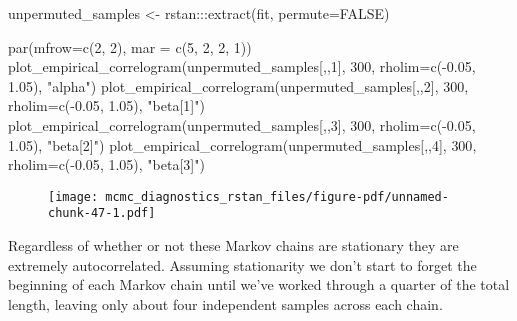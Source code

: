 \documentclass[
  letterpaper,
  DIV=11,
  numbers=noendperiod]{scrartcl}
\newenvironment{Shaded}{\begin{snugshade}}{\end{snugshade}}
\newcommand{\AttributeTok}[1]{\textcolor[rgb]{0.40,0.45,0.13}{#1}}
\newcommand{\ConstantTok}[1]{\textcolor[rgb]{0.56,0.35,0.01}{#1}}
\newcommand{\DecValTok}[1]{\textcolor[rgb]{0.68,0.00,0.00}{#1}}
\newcommand{\FloatTok}[1]{\textcolor[rgb]{0.68,0.00,0.00}{#1}}
\newcommand{\FunctionTok}[1]{\textcolor[rgb]{0.28,0.35,0.67}{#1}}
\newcommand{\NormalTok}[1]{\textcolor[rgb]{0.00,0.23,0.31}{#1}}
\newcommand{\OtherTok}[1]{\textcolor[rgb]{0.00,0.23,0.31}{#1}}
\newcommand{\SpecialCharTok}[1]{\textcolor[rgb]{0.37,0.37,0.37}{#1}}
\newcommand{\StringTok}[1]{\textcolor[rgb]{0.13,0.47,0.30}{#1}}
\begin{document}
\begin{Shaded}
\begin{Highlighting}[]
\NormalTok{unpermuted\_samples }\OtherTok{\textless{}{-}}\NormalTok{ rstan}\SpecialCharTok{:::}\FunctionTok{extract}\NormalTok{(fit, }\AttributeTok{permute=}\ConstantTok{FALSE}\NormalTok{)}

\FunctionTok{par}\NormalTok{(}\AttributeTok{mfrow=}\FunctionTok{c}\NormalTok{(}\DecValTok{2}\NormalTok{, }\DecValTok{2}\NormalTok{), }\AttributeTok{mar =} \FunctionTok{c}\NormalTok{(}\DecValTok{5}\NormalTok{, }\DecValTok{2}\NormalTok{, }\DecValTok{2}\NormalTok{, }\DecValTok{1}\NormalTok{))}
\FunctionTok{plot\_empirical\_correlogram}\NormalTok{(unpermuted\_samples[,,}\DecValTok{1}\NormalTok{], }\DecValTok{300}\NormalTok{,}
                           \AttributeTok{rholim=}\FunctionTok{c}\NormalTok{(}\SpecialCharTok{{-}}\FloatTok{0.05}\NormalTok{, }\FloatTok{1.05}\NormalTok{), }\StringTok{"alpha"}\NormalTok{)}
\FunctionTok{plot\_empirical\_correlogram}\NormalTok{(unpermuted\_samples[,,}\DecValTok{2}\NormalTok{], }\DecValTok{300}\NormalTok{,}
                           \AttributeTok{rholim=}\FunctionTok{c}\NormalTok{(}\SpecialCharTok{{-}}\FloatTok{0.05}\NormalTok{, }\FloatTok{1.05}\NormalTok{), }\StringTok{"beta[1]"}\NormalTok{)}
\FunctionTok{plot\_empirical\_correlogram}\NormalTok{(unpermuted\_samples[,,}\DecValTok{3}\NormalTok{], }\DecValTok{300}\NormalTok{,}
                           \AttributeTok{rholim=}\FunctionTok{c}\NormalTok{(}\SpecialCharTok{{-}}\FloatTok{0.05}\NormalTok{, }\FloatTok{1.05}\NormalTok{), }\StringTok{"beta[2]"}\NormalTok{)}
\FunctionTok{plot\_empirical\_correlogram}\NormalTok{(unpermuted\_samples[,,}\DecValTok{4}\NormalTok{], }\DecValTok{300}\NormalTok{,}
                           \AttributeTok{rholim=}\FunctionTok{c}\NormalTok{(}\SpecialCharTok{{-}}\FloatTok{0.05}\NormalTok{, }\FloatTok{1.05}\NormalTok{), }\StringTok{"beta[3]"}\NormalTok{)}
\end{Highlighting}
\end{Shaded}

\begin{figure}[H]

{\centering \texttt{[image: mcmc\_diagnostics\_rstan\_files/figure-pdf/unnamed-chunk-47-1.pdf]}

}

\end{figure}

Regardless of whether or not these Markov chains are stationary they are
extremely autocorrelated. Assuming stationarity we don't start to forget
the beginning of each Markov chain until we've worked through a quarter
of the total length, leaving only about four independent samples across
each chain.
\end{document}
